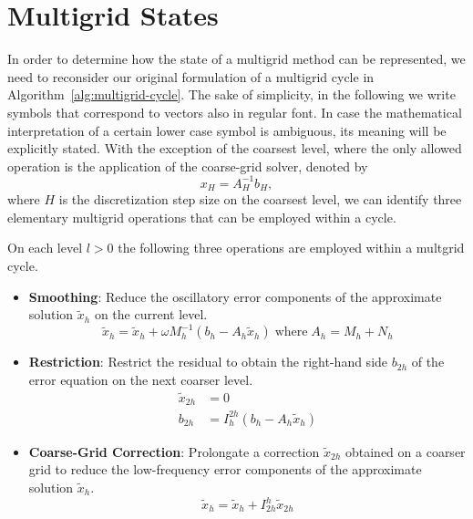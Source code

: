 \section{Multigrid States}
\label{sec:multigrid-states}
In order to determine how the state of a multigrid method can be represented, we need to reconsider our original formulation of a multigrid cycle in Algorithm~\ref{alg:multigrid-cycle}.
The sake of simplicity, in the following we write symbols that correspond to vectors also in regular font.
In case the mathematical interpretation of a certain lower case symbol is ambiguous, its meaning will be explicitly stated. 
With the exception of the coarsest level, where the only allowed operation is the application of the coarse-grid solver, denoted by
\begin{equation*}
	x_{H} = A^{-1}_H b_H,
\end{equation*}
where $H$ is the discretization step size on the coarsest level, we can identify three elementary multigrid operations that can be employed within a cycle.
\begin{definition}
\label{def:elementary-multigrid-operations}
On each level $l > 0$ the following three operations are employed within a multgrid cycle.
\begin{itemize}
	\item \textbf{Smoothing}: Reduce the oscillatory error components of the approximate solution $\tilde{x}_h$ on the current level. 
	\begin{equation*}
		\tilde{x}_h = \tilde{x}_h + \omega M_h^{-1} \left( b_h - A_h \tilde{x}_h \right) \; \text{where} \; A_h = M_h + N_h
	\end{equation*}
	\item \textbf{Restriction}: Restrict the residual to obtain the right-hand side $b_{2h}$ of the error equation on the next coarser level.
	\begin{align*}
		\tilde{x}_{2h} & = 0 \\
		b_{2h} & = I_h^{2h} (b_h - A_h \tilde{x}_h)
	\end{align*}
	\item \textbf{Coarse-Grid Correction}: Prolongate a correction $\tilde{x}_{2h}$ obtained on a coarser grid to reduce the low-frequency error components of the approximate solution $\tilde{x}_h$.
	\begin{equation*}
		\tilde{x}_h = \tilde{x}_h + I_{2h}^h \tilde{x}_{2h}
	\end{equation*}
\end{itemize}
\end{definition}
